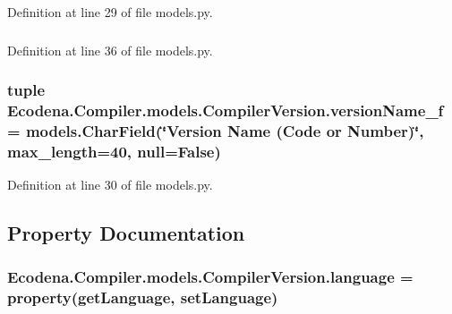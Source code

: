 Definition at line 29 of file models.py.

\hypertarget{class_ecodena_1_1_compiler_1_1models_1_1_compiler_version_a291df582643fb8a9656fa606d0aeb2fb}{
\subsubsection[{versionName\_\-f}]{}}
\label{d0/d33/class_ecodena_1_1_compiler_1_1models_1_1_compiler_version_a291df582643fb8a9656fa606d0aeb2fb}


Definition at line 36 of file models.py.

\hypertarget{class_ecodena_1_1_compiler_1_1models_1_1_compiler_version_a9be00a776bb40cc37f23b40c7b986ff5}{
\subsubsection[{versionName\_\-f}]{\setlength{\rightskip}{0pt plus 5cm}tuple {\bf Ecodena.Compiler.models.CompilerVersion.versionName\_\-f} = models.CharField(\char`\"{}Version Name (Code or Number)\char`\"{}, max\_\-length=40, null=False)}}
\label{d0/d33/class_ecodena_1_1_compiler_1_1models_1_1_compiler_version_a9be00a776bb40cc37f23b40c7b986ff5}


Definition at line 30 of file models.py.



\subsection{Property Documentation}
\hypertarget{class_ecodena_1_1_compiler_1_1models_1_1_compiler_version_a85336927773b44cf99358d191699d97f}{
\subsubsection[{language}]{\setlength{\rightskip}{0pt plus 5cm}Ecodena.Compiler.models.CompilerVersion.language = property(getLanguage, setLanguage)}}
\label{d0/d33/class_ecodena_1_1_compiler_1_1models_1_1_compiler_version_a85336927773b44cf99358d191699d97f}


